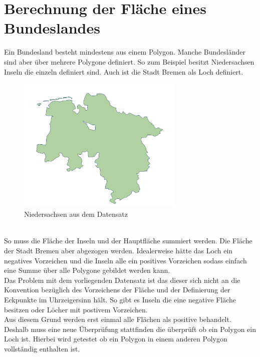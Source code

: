 \documentclass[conference]{IEEEtran}
\begin{document}
	
	\section{Berechnung der Fläche eines Bundeslandes}
	Ein Bundesland besteht mindestens aus einem Polygon. Manche Bundesländer sind aber über mehrere Polygone definiert. So zum Beispiel besitzt Niedersachsen Inseln die einzeln definiert sind. Auch ist die Stadt Bremen als Loch definiert. 
	\begin{figure}[h]
		\begin{center}
			\includegraphics[width=8cm]{Niedersachsen.png}
			\caption{Niedersachsen aus dem Datensatz}
			\label{Niedersachsen}
		\end{center}
	\end{figure}\\
	So muss die Fläche der Inseln und der Hauptfläche summiert werden. Die Fläche der Stadt Bremen aber abgezogen werden. Idealerweise hätte das Loch ein negatives Vorzeichen und die Inseln alle ein positives Vorzeichen sodass einfach eine Summe über alle Polygone gebildet werden kann.\\
	Das Problem mit dem vorliegenden Datensatz ist das dieser sich nicht an die Konvention bezüglich des Vorzeichens der Fläche und der Definierung der Eckpunkte im Uhrzeigersinn hält. So gibt es Inseln die eine negative Fläche besitzen oder Löcher mit postivem Vorzeichen.\\
	Aus diesem Grund werden erst einmal alle Flächen als positive behandelt. Deshalb muss eine neue Überprüfung stattfinden die überprüft ob ein Polygon ein Loch ist. Hierbei wird getestet ob ein Polygon in einem anderen Polygon vollständig enthalten ist.
\end{document}
